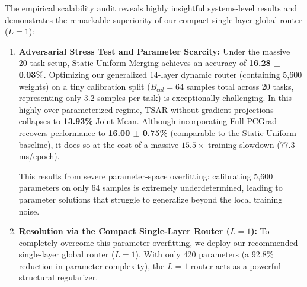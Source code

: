 The empirical scalability audit reveals highly insightful systems-level results and demonstrates the remarkable superiority of our compact single-layer global router ($L=1$):
\begin{enumerate}
    \item \textbf{Adversarial Stress Test and Parameter Scarcity:} Under the massive 20-task setup, Static
Uniform Merging achieves an accuracy of \textbf{16.28 $\pm$ 0.03\%}. Optimizing our generalized 14-layer dynamic router (containing 5,600 weights) on a tiny calibration split ($B_{cal} = 64$ samples total across 20 tasks, representing only $3.2$ samples per task) is exceptionally challenging. In this highly over-parameterized regime, TSAR without gradient projections collapses to \textbf{13.93\%} Joint Mean. Although incorporating Full PCGrad recovers performance to \textbf{16.00 $\pm$ 0.75\%} (comparable to the Static Uniform baseline), it does so at the cost of a massive $15.5\times$ training slowdown (77.3 ms/epoch).
    
    This results from severe parameter-space overfitting: calibrating 5,600 parameters on only 64 samples is extremely underdetermined, leading to parameter solutions that struggle to generalize beyond the local training noise.
    \item \textbf{Resolution via the Compact Single-Layer Router ($L=1$):} To completely overcome this parameter overfitting, we deploy our recommended single-layer global router ($L=1$). With only 420 parameters (a 92.8\% reduction in parameter complexity), the $L=1$ router acts as a powerful structural regularizer. 
    

\end{enumerate}
